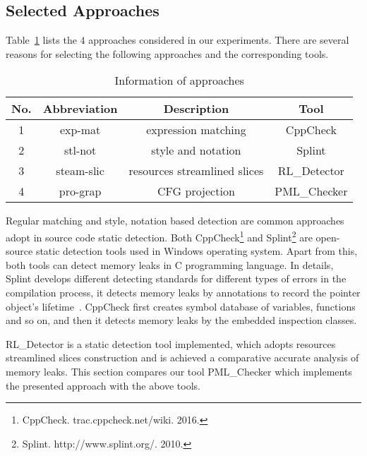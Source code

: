 \subsection{Selected Approaches}\label{ssec:ca}
Table~\ref{tab:1} lists the $4$ approaches considered in our experiments. There are several reasons for selecting the following approaches and the corresponding tools. 
%
\begin{table}[!h]
\center
\caption{Information of approaches}\label{tab:1}
\begin{tabular}{|c|c|c|c|}
\hline
\textbf{No.} & \textbf{Abbreviation} & \textbf{Description} & \textbf{Tool}\\
\hline
1 & exp-mat & expression matching & CppCheck\\
\hline
2 & stl-not & style and notation &	Splint\\
\hline
3 & steam-slic & resources streamlined slices & RL\_Detector\\
\hline
4 & pro-grap &	CFG projection &	PML\_Checker\\
\hline
\end{tabular}
\end{table}
%
Regular matching and style, notation based detection are common approaches adopt in source code static detection. Both CppCheck\footnote{CppCheck. trac.cppcheck.net/wiki. 2016.} and Splint\footnote{Splint. http://www.splint.org/. 2010.} are open-source static detection tools used in Windows operating system. Apart from this, both tools can detect memory leaks in C programming language. In details, Splint develops different detecting standards for different types of errors in the compilation process, it detects memory leaks by annotations to record the pointer object’s lifetime~\cite{EL02}. CppCheck first creates symbol database of variables, functions and so on, and then it detects memory leaks by the embedded inspection classes.
 
RL\_Detector is a static detection tool implemented, which adopts resources streamlined slices construction and is achieved a comparative accurate analysis of memory leaks. This section compares our tool PML\_Checker which implements the presented approach with the above tools.

